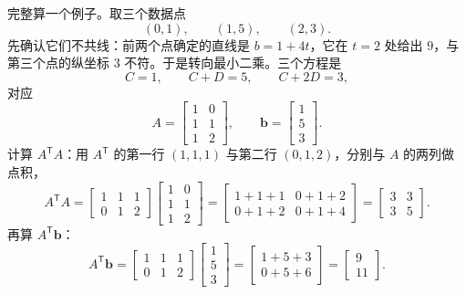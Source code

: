 \documentclass[UTF8,a4paper,12pt]{ctexart}
\numberwithin{equation}{section}
\newcommand{\trans}{^{\mathsf T}}
\begin{document}
	完整算一个例子。取三个数据点
	\begin{equation}\label{eq:6.62}
	(0,1),
	\qquad
	(1,5),
	\qquad
	(2,3).
	\end{equation}
	先确认它们不共线：前两个点确定的直线是 $b=1+4t$，它在 $t=2$ 处给出 $9$，与第三个点的纵坐标 $3$ 不符。于是转向最小二乘。三个方程是
	\begin{equation}\label{eq:6.63}
	C=1,
	\qquad
	C+D=5,
	\qquad
	C+2D=3,
	\end{equation}
	对应
	\begin{equation}\label{eq:6.64}
	A=
	\begin{bmatrix}
		1&0\\
		1&1\\
		1&2
	\end{bmatrix},
	\qquad
	\bm{b}=
	\begin{bmatrix}
		1\\
		5\\
		3
	\end{bmatrix}.
	\end{equation}
	计算 $A\trans A$：用 $A\trans$ 的第一行 $(1,1,1)$ 与第二行 $(0,1,2)$，分别与 $A$ 的两列做点积，
	\begin{equation}\label{eq:6.65}
	A\trans A
	=
	\begin{bmatrix}
		1&1&1\\
		0&1&2
	\end{bmatrix}
	\begin{bmatrix}
		1&0\\
		1&1\\
		1&2
	\end{bmatrix}
	=
	\begin{bmatrix}
		1+1+1&0+1+2\\
		0+1+2&0+1+4
	\end{bmatrix}
	=
	\begin{bmatrix}
		3&3\\
		3&5
	\end{bmatrix}.
	\end{equation}
	再算 $A\trans\bm{b}$：
	\begin{equation}\label{eq:6.66}
	A\trans\bm{b}
	=
	\begin{bmatrix}
		1&1&1\\
		0&1&2
	\end{bmatrix}
	\begin{bmatrix}
		1\\
		5\\
		3
	\end{bmatrix}
	=
	\begin{bmatrix}
		1+5+3\\
		0+5+6
	\end{bmatrix}
	=
	\begin{bmatrix}
		9\\
		11
	\end{bmatrix}.
	\end{equation}
\end{document}
